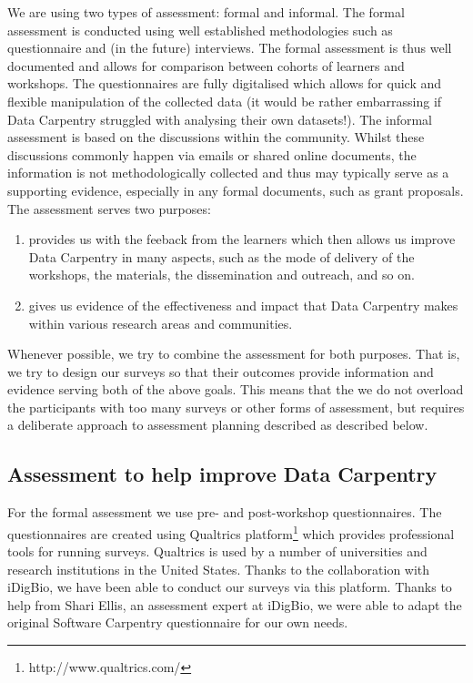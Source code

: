 \documentclass[15]{idcc}
\begin{document}
\begin{itemize}
We are using two types of assessment: formal and informal. The formal assessment is conducted using well established
methodologies such as questionnaire and (in the future) interviews. The formal assessment is thus well documented and allows for comparison
between cohorts of learners and workshops. The questionnaires are fully digitalised which allows for quick and flexible manipulation of the
collected data (it would be rather embarrassing if Data Carpentry struggled with analysing their own datasets!). The informal assessment is
based on the discussions within the community. Whilst these discussions commonly happen via emails or shared online documents, the information
is not methodologically collected and thus may typically serve as a supporting evidence, especially in any formal documents, such as grant
proposals.\\

The assessment serves two purposes:
\begin{enumerate}
\item provides us with the feeback from the learners which then allows us improve Data Carpentry in many aspects, such as the mode of
delivery of the workshops, the materials, the dissemination and outreach, and so on.
\item gives us evidence of the effectiveness and impact that Data Carpentry makes within various research areas and communities.
\end{enumerate}

Whenever possible, we try to combine the assessment for both purposes. That is, we try to design our surveys so that their outcomes provide
information and evidence serving both of the above goals. This means that the we do not overload the participants with too many surveys
or other forms of assessment, but requires a deliberate approach to assessment planning described as described below.


\subsection{Assessment to help improve Data Carpentry}
For the formal assessment we use pre- and post-workshop questionnaires. The questionnaires are created using Qualtrics platform\footnote{http://www.qualtrics.com/}
which provides professional tools for running surveys. Qualtrics is used by a number of universities and research institutions in the United States.
Thanks to the collaboration with iDigBio, we have been able to conduct our surveys via this platform. Thanks to help from Shari Ellis, an
 assessment expert at iDigBio, we were able to adapt the original Software Carpentry questionnaire for our own needs. \\


\end{itemize}
\end{document}
